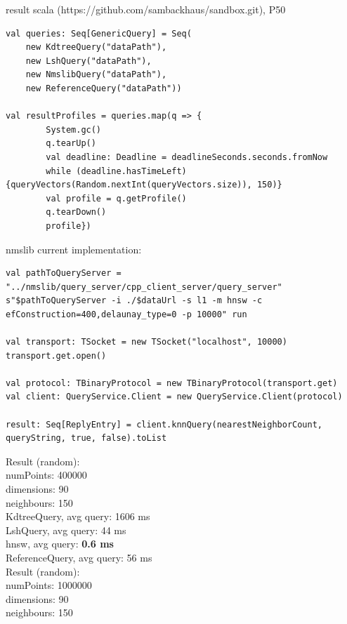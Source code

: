 \documentclass[xcolor=dvipsnames, aspectratio=1610]{beamer}
\newcommand{\alertA}[1]{\color{alertAcolor}#1\color{Black}}
\begin{document}
\begin{frame}[fragile]{result scala (https://github.com/sambackhaus/sandbox.git), P50} 
\linespread{1}\scriptsize{
\begin{minipage}{0.55\textwidth}  

\begin{lstlisting}[style=myScalastyle]
val queries: Seq[GenericQuery] = Seq(
	new KdtreeQuery("dataPath"),
	new LshQuery("dataPath"),
	new NmslibQuery("dataPath"),
	new ReferenceQuery("dataPath"))

val resultProfiles = queries.map(q => {
		System.gc()
		q.tearUp()
		val deadline: Deadline = deadlineSeconds.seconds.fromNow
		while (deadline.hasTimeLeft) {queryVectors(Random.nextInt(queryVectors.size)), 150)}
		val profile = q.getProfile()
		q.tearDown()
		profile})
\end{lstlisting}

nmslib current implementation:
\begin{lstlisting}[style=myScalastyle]
val pathToQueryServer = "../nmslib/query_server/cpp_client_server/query_server"
s"$pathToQueryServer -i ./$dataUrl -s l1 -m hnsw -c efConstruction=400,delaunay_type=0 -p 10000" run

val transport: TSocket = new TSocket("localhost", 10000)
transport.get.open()

val protocol: TBinaryProtocol = new TBinaryProtocol(transport.get)
val client: QueryService.Client = new QueryService.Client(protocol)

result: Seq[ReplyEntry] = client.knnQuery(nearestNeighborCount, queryString, true, false).toList
\end{lstlisting}

\end{minipage}
\hfill
\begin{minipage}{0.40\textwidth}  


\begin{flushleft}
Result (random):\\
numPoints: 400000\\
dimensions: 90\\
neighbours: 150\\

KdtreeQuery, avg query: 1606 ms\\
LshQuery, avg query: 44 ms\\
hnsw, avg query: {\alertA{\bf{0.6 ms}}}\\
ReferenceQuery, avg query: 56 ms\\
\vspace{0.2cm}
Result (random):\\
numPoints: 1000000\\
dimensions: 90\\
neighbours: 150\\


\end{flushleft}
\end{minipage}}
\end{frame}
\end{document}
